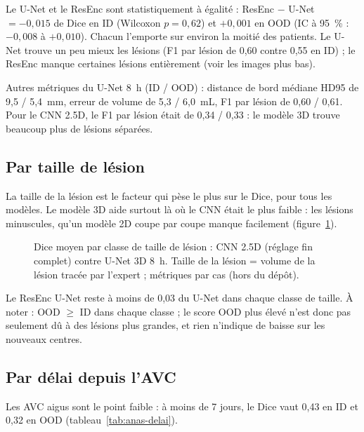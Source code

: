 Le U-Net et le ResEnc sont statistiquement à égalité : ResEnc $-$ U-Net $= -0{,}015$ de Dice en ID (Wilcoxon $p = 0{,}62$) et $+0{,}001$ en OOD (IC à 95~\% : $-0{,}008$ à $+0{,}010$).
Chacun l'emporte sur environ la moitié des patients.
Le U-Net trouve un peu mieux les lésions (F1 par lésion de 0,60 contre 0,55 en ID) ; le ResEnc manque certaines lésions entièrement (voir les images plus bas).

Autres métriques du U-Net 8~h (ID / OOD) : distance de bord médiane HD95 de 9,5 / 5,4~mm, erreur de volume de 5,3 / 6,0~mL, F1 par lésion de 0,60 / 0,61.
Pour le CNN 2.5D, le F1 par lésion était de 0,34 / 0,33 : le modèle 3D trouve beaucoup plus de lésions séparées.

\subsection{Par taille de lésion}

La taille de la lésion est le facteur qui pèse le plus sur le Dice, pour tous les modèles.
Le modèle 3D aide surtout là où le CNN était le plus faible : les lésions minuscules, qu'un modèle 2D coupe par coupe manque facilement (figure~\ref{fig:anas-taille}).

\begin{figure}[htbp]
  \centering
  \caption{Dice moyen par classe de taille de lésion : CNN 2.5D (réglage fin complet) contre U-Net 3D 8~h. Taille de la lésion = volume de la lésion tracée par l'expert ; métriques par cas (hors du dépôt).}
  \label{fig:anas-taille}
\end{figure}

Le ResEnc U-Net reste à moins de 0,03 du U-Net dans chaque classe de taille.
À noter : OOD $\geq$ ID dans chaque classe ; le score OOD plus élevé n'est donc pas seulement dû à des lésions plus grandes, et rien n'indique de baisse sur les nouveaux centres.

\subsection{Par délai depuis l'AVC}

Les AVC aigus sont le point faible : à moins de 7 jours, le Dice vaut 0,43 en ID et 0,32 en OOD (tableau~\ref{tab:anas-delai}).

